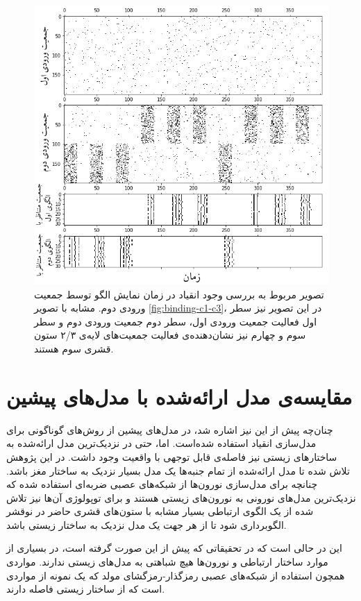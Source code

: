 \documentclass[12pt]{report}
\begin{document}
\begin{figure}[H]
	\centering
	\includegraphics[width=1.0\linewidth]{binding-c2-c3.png}
	\caption[NS]{
		تصویر مربوط به بررسی وجود انقیاد در زمان نمایش الگو توسط جمعیت ورودی دوم. مشابه با تصویر \ref{fig:binding-c1-c3}، در این تصویر نیز سطر اول فعالیت جمعیت ورودی اول، سطر دوم جمعیت ورودی دوم و سطر سوم و چهارم نیز نشان‌دهنده‌ی فعالیت جمعیت‌های لایه‌ی ۲/۳ ستون قشری سوم هستند.
	}
	\label{fig:binding-c2-c3} 
\end{figure}

	
	\section{مقایسه‌ی مدل ارائه‌شده با مدل‌های پیشین}
	چنان‌چه پیش از این نیز اشاره شد، در مدل‌های پیشین از روش‌های گوناگونی برای مدل‌سازی انقیاد استفاده شده‌است. اما، حتی در نزدیک‌ترین مدل ارائه‌شده به ساختار‌های زیستی نیز فاصله‌ی قابل توجهی با واقعیت وجود داشت. در این پژوهش تلاش شده تا مدل ارائه‌شده از تمام جنبه‌ها یک مدل بسیار نزدیک به ساختار مغز باشد. چنانچه برای مدل‌سازی نورون‌ها از شبکه‌های عصبی ضربه‌ای استفاده شده که نزدیک‌ترین مدل‌های نورونی به نورون‌های زیستی هستند و برای توپولوژی آن‌ها نیز تلاش شده از یک الگوی ارتباطی بسیار مشابه با ستون‌های قشری حاضر در نوقشر الگوبرداری شود تا از هر جهت یک مدل نزدیک به ساختار زیستی باشد.
	
	این در حالی است که در تحقیقاتی که پیش از این صورت گرفته است، در بسیاری از موارد ساختار ارتباطی و نورون‌ها هیچ شباهتی به مدل‌های زیستی ندارند. مواردی همچون استفاده از شبکه‌های عصبی رمزگذار-رمزگشای مولد که یک نمونه از مواردی است که از ساختار زیستی فاصله دارند.
	
\end{document}
